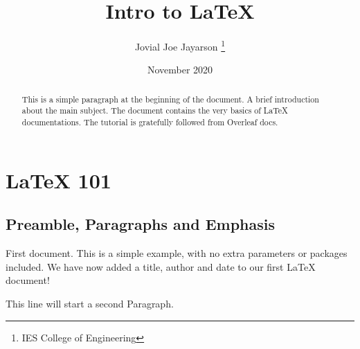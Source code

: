 \documentclass[12pt, a4paper]{report}
\title{Intro to \LaTeX{}}
\author{Jovial Joe Jayarson \thanks{IES College of Engineering}}
\date{November 2020}
\begin{document}
\maketitle %

\begin{abstract}
    This is a simple paragraph at the beginning of the document. A brief introduction about the main subject. The document contains the very basics of \LaTeX{} documentations. The tutorial is gratefully followed from Overleaf docs.
\end{abstract}

\chapter{\LaTeX{} 101} %



\section{Preamble, Paragraphs and Emphasis}

First document. This is a simple example, with no extra parameters or packages included. We have now added a title, author and date to our first \LaTeX{} document!

This line will start a second Paragraph.

\end{document}
